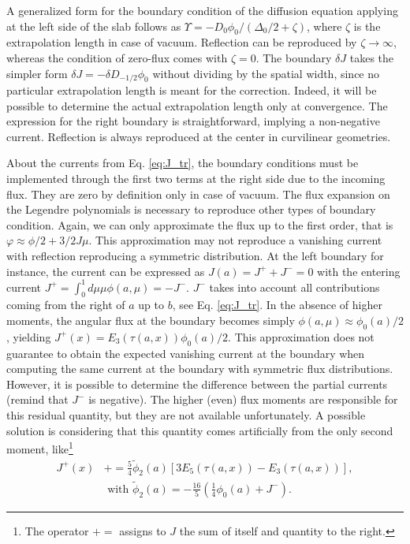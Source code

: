 \documentclass{ictt26}
\newcommand{\pluseq}{\mathrel{+}=}
\begin{document}
A generalized form for the boundary condition of the diffusion equation applying at the left side of the slab follows as $\Upsilon = - D_0 \phi_0 / (\Delta_0 / 2 + \zeta)$, where $\zeta$ is the extrapolation length in case of vacuum. Reflection can be reproduced by $\zeta \rightarrow \infty$, whereas the condition of zero-flux comes with $\zeta = 0$. The boundary $\delta J$ takes the simpler form $\delta J = - \delta D_{-1/2} \phi_0$ without dividing by the spatial width, since no particular extrapolation length is meant for the correction. Indeed, it will be possible to determine the actual extrapolation length only at convergence. The expression for the right boundary is straightforward, implying a non-negative current. Reflection is always reproduced at the center in curvilinear geometries.

About the currents from Eq. \ref{eq:J_tr}, the boundary conditions must be implemented through the first two terms at the right side due to the incoming flux. They are zero by definition only in case of vacuum. The flux expansion on the Legendre polynomials is necessary to reproduce other types of boundary condition. Again, we can only approximate the flux up to the first order, that is $\varphi \approx \phi/2 + 3/2 J \mu$. This approximation may not reproduce a vanishing current with reflection reproducing a symmetric distribution. At the left boundary for instance, the current can be expressed as $J(a) =  J^+ + J^- = 0$ with the entering current $J^+ = \int_0^1 { d\mu \mu \phi(a, \mu) } = - J^-$. $J^-$ takes into account all contributions coming from the right of $a$ up to $b$, see Eq. \ref{eq:J_tr}. In the absence of higher moments, the angular flux at the boundary becomes simply $\phi(a, \mu) \approx \phi_0(a) / 2$, yielding $J^+(x) = E_3 \left(\tau(a, x)\right)\phi_0(a)/2$. This approximation does not guarantee to obtain the expected vanishing current at the boundary when computing the same current at the boundary with symmetric flux distributions. However, it is possible to determine the difference between the partial currents (remind that $J^-$ is negative). The higher (even) flux moments are responsible for this residual quantity, but they are not available unfortunately. A possible solution is considering that this quantity comes artificially from the only second moment, like\footnote{The operator $\pluseq$ assigns to $J$ the sum of itself and quantity to the right.}
\begin{equation}
\begin{split}
J^+(x) &\pluseq \frac{5}{4} \tilde{\phi}_2(a) \left[ 3 E_5(\tau(a, x)) - E_3(\tau(a, x)) \right],\\ &\text{ with } \tilde{\phi}_2(a) = - \frac{16}{5} \left( \frac{1}{4} \phi_0(a) + J^- \right).
\end{split}
\end{equation}
\end{document}
